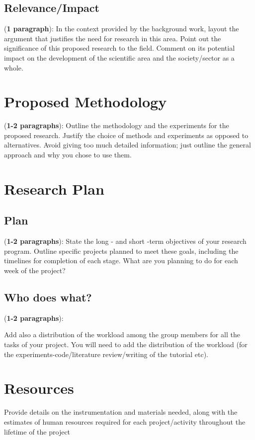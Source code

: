 \documentclass{article}
\begin{document}
\subsection{Relevance/Impact}
(\textbf{1 paragraph}): In the context provided by the background work, layout the argument that justifies the need for research in this area. Point out the significance of this proposed research to the field. Comment on its potential impact on the development of the scientific area and the society/sector as a whole.

\section{Proposed Methodology}
(\textbf{1-2 paragraphs}): Outline the methodology and the experiments for the proposed research. Justify the choice of methods and experiments as opposed to alternatives. Avoid giving too much detailed information; just outline the general approach and why you chose to use them.

\section{Research Plan}

\subsection{Plan}
(\textbf{1-2 paragraphs}): State the long - and short -term objectives of your research program. Outline specific projects planned to meet these goals, including the timelines for completion of each stage. What are you planning to do for each week of the project?

\subsection{Who does what?}
(\textbf{1-2 paragraphs}):

Add also a distribution of the workload among the group members for all the tasks of your project. You will need to add the distribution of the workload (for the experiments-code/literature review/writing of the tutorial etc).

\section{Resources}
Provide details on the instrumentation and materials needed, along with the estimates of human resources required for each project/activity throughout the lifetime of the project
\end{document}
